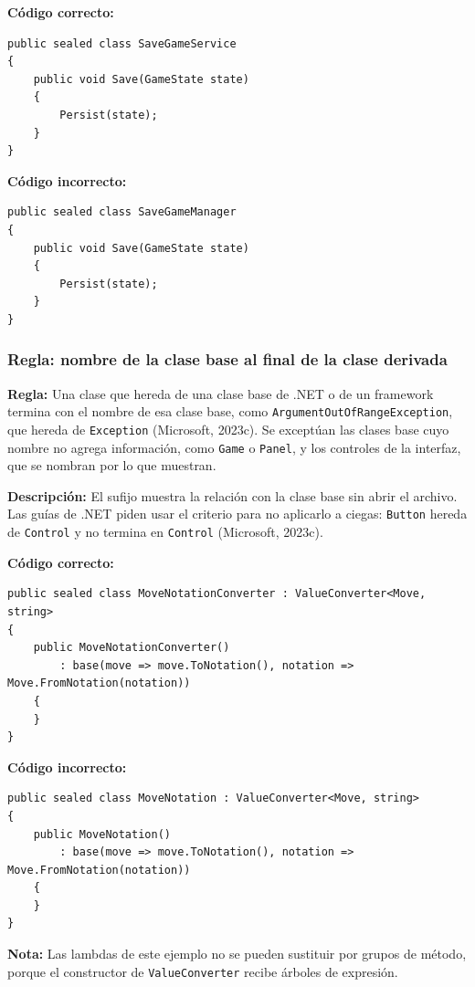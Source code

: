 \textbf{Código correcto:}
\begin{lstlisting}[style=csharpstyle]
public sealed class SaveGameService
{
    public void Save(GameState state)
    {
        Persist(state);
    }
}
\end{lstlisting}

\textbf{Código incorrecto:}
\begin{lstlisting}[style=csharpstyle]
public sealed class SaveGameManager
{
    public void Save(GameState state)
    {
        Persist(state);
    }
}
\end{lstlisting}

\subsubsection{Regla: nombre de la clase base al final de la clase derivada}

\textbf{Regla:} Una clase que hereda de una clase base de .NET o de un framework termina con el nombre de esa clase base, como \texttt{ArgumentOutOfRangeException}, que hereda de \texttt{Exception} (Microsoft, 2023c). Se exceptúan las clases base cuyo nombre no agrega información, como \texttt{Game} o \texttt{Panel}, y los controles de la interfaz, que se nombran por lo que muestran.

\textbf{Descripción:} El sufijo muestra la relación con la clase base sin abrir el archivo. Las guías de .NET piden usar el criterio para no aplicarlo a ciegas: \texttt{Button} hereda de \texttt{Control} y no termina en \texttt{Control} (Microsoft, 2023c).

\textbf{Código correcto:}
\begin{lstlisting}[style=csharpstyle]
public sealed class MoveNotationConverter : ValueConverter<Move, string>
{
    public MoveNotationConverter()
        : base(move => move.ToNotation(), notation => Move.FromNotation(notation))
    {
    }
}
\end{lstlisting}

\textbf{Código incorrecto:}
\begin{lstlisting}[style=csharpstyle]
public sealed class MoveNotation : ValueConverter<Move, string>
{
    public MoveNotation()
        : base(move => move.ToNotation(), notation => Move.FromNotation(notation))
    {
    }
}
\end{lstlisting}

\textbf{Nota:} Las lambdas de este ejemplo no se pueden sustituir por grupos de método, porque el constructor de \texttt{ValueConverter} recibe árboles de expresión.

